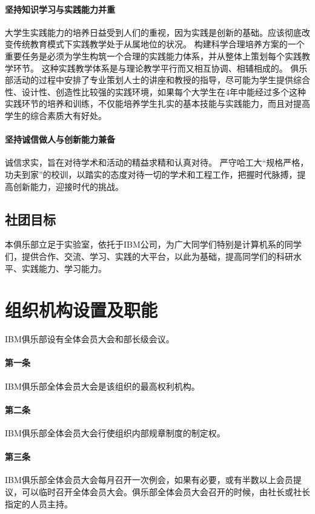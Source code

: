 \documentclass{club}
\begin{document}
\paragraph{坚持知识学习与实践能力并重}大学生实践能力的培养日益受到人们的重视，因为实践是创新的基础。应该彻底改变传统教育模式下实践教学处于从属地位的状况。
构建科学合理培养方案的一个重要任务是必须为学生构筑一个合理的实践能力体系，并从整体上策划每个实践教学环节。
这种实践教学体系是与理论教学平行而又相互协调、相辅相成的。
俱乐部活动的过程中安排了专业策划人士的讲座和教授的指导，尽可能为学生提供综合性、设计性、创造性比较强的实践环境，如果每个大学生在4年中能经过多个这种实践环节的培养和训练，不仅能培养学生扎实的基本技能与实践能力，而且对提高学生的综合素质大有好处。

\paragraph{坚持诚信做人与创新能力兼备}诚信求实，旨在对待学术和活动的精益求精和认真对待。
严守哈工大“规格严格，功夫到家”的校训，以踏实的态度对待一切的学术和工程工作，把握时代脉搏，提高创新能力，迎接时代的挑战。

\subsection{社团目标}

本俱乐部立足于实验室，依托于IBM公司，为广大同学们特别是计算机系的同学们，提供合作、交流、学习、实践的大平台，以此为基础，提高同学们的科研水平、实践能力、学习能力。

\section{组织机构设置及职能}

IBM俱乐部设有全体会员大会和部长级会议。

\paragraph{第一条}IBM俱乐部全体会员大会是该组织的最高权利机构。
\paragraph{第二条}IBM俱乐部全体会员大会行使组织内部规章制度的制定权。
\paragraph{第三条}IBM俱乐部全体会员大会每月召开一次例会，如果有必要，或有半数以上会员提议，可以临时召开全体会员大会。俱乐部全体会员大会召开的时候，由社长或社长指定的人员主持。
\end{document}
